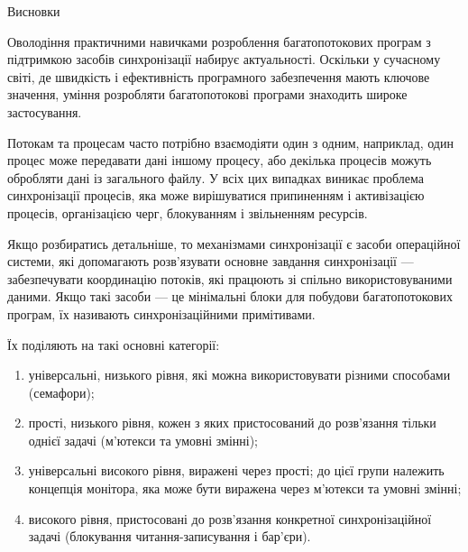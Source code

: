 \documentclass[a4paper,12pt]{article}
\begin{document}
\newpage
    \begin{center}
        \Large{Висновки}
    \end{center}

    Оволодіння практичними навичками розроблення багатопотокових програм з підтримкою засобів синхронізації набирує актуальності. 
    Оскільки у сучасному світі, де швидкість і ефективність програмного забезпечення мають ключове значення, уміння розробляти багатопотокові 
    програми знаходить широке застосування.

    Потокам та процесам часто потрібно взаємодіяти один з одним, наприклад, один процес може передавати дані іншому процесу, або декілька процесів можуть обробляти 
    дані із загального файлу. У всіх цих випадках виникає проблема синхронізації процесів, яка може вирішуватися припиненням і активізацією процесів, організацією черг, блокуванням і звільненням ресурсів.

    Якщо розбиратись детальніше, то механізмами синхронізації є засоби операційної системи, які допомагають розв'язувати основне завдання синхронізації — забезпечувати 
    координацію потоків, які працюють зі спільно використовуваними даними. Якщо такі засоби — це мінімальні блоки для побудови багатопотокових програм, 
    їх називають синхронізаційними примітивами. 

    Їх поділяють на такі основні категорії:
    \begin{enumerate}
        \item універсальні, низького рівня, які можна використовувати різними способами (семафори);
        \item прості, низького рівня, кожен з яких пристосований до розв'язання тільки однієї задачі (м'ютекси та умовні змінні);
        \item універсальні високого рівня, виражені через прості; до цієї групи належить концепція монітора, яка може бути виражена через м'ютекси та умовні змінні;
        \item високого рівня, пристосовані до розв'язання конкретної синхронізаційної задачі (блокування читання-записування і бар'єри).
    \end{enumerate} 
\end{document}
